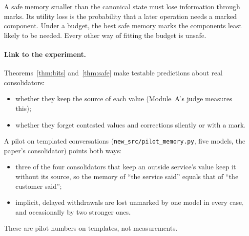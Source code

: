 \begin{corollary}
A safe memory smaller than the canonical state must lose information through marks. Its utility
loss is the probability that a later operation needs a marked component. Under a budget, the best
safe memory marks the components least likely to be needed. Every other way of fitting the budget
is unsafe.
\end{corollary}

\paragraph{Link to the experiment.} Theorems~\ref{thm:bits} and~\ref{thm:safe} make testable
predictions about real consolidators:
\begin{itemize}
\item whether they keep the source of each value (Module~A's judge measures this);
\item whether they forget contested values and corrections silently or with a mark.
\end{itemize}
A pilot on templated conversations (\texttt{new\_src/pilot\_memory.py}, five models, the paper's
consolidator) points both ways:
\begin{itemize}
\item three of the four consolidators that keep an outside service's value keep it without its
  source, so the memory of ``the service said'' equals that of ``the customer said'';
\item implicit, delayed withdrawals are lost unmarked by one model in every case, and occasionally
  by two stronger ones.
\end{itemize}
These are pilot numbers on templates, not measurements.
